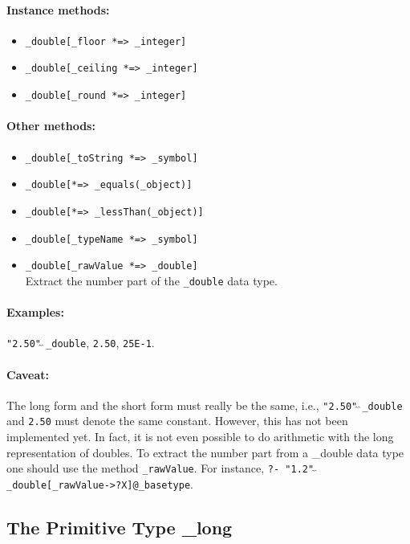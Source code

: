 \documentclass[11pt]{article}
\begin{document}
\paragraph{Instance methods:}
\begin{itemize}
\item {\tt \_double[\_floor *=> \_integer]}
\item {\tt \_double[\_ceiling *=> \_integer]}
\item {\tt \_double[\_round *=> \_integer]}
\end{itemize}

\paragraph{Other methods:}
\begin{itemize}
\item {\tt \_double[\_toString *=> \_symbol]}
\item {\tt \_double[*=> \_equals(\_object)]}
\item {\tt \_double[*=> \_lessThan(\_object)]}
\item {\tt \_double[\_typeName *=> \_symbol]}
\item {\tt \_double[\_rawValue *=> \_double]}
  \\
  Extract the number part of the {\tt \_double} data type. 
\end{itemize}

\paragraph{Examples:}  {\tt "2.50"$\hat{~}\hat{~}$\_double}, {\tt 2.50},
{\tt 25E-1}.

\paragraph{Caveat:}  The long form and the short form must really be the
same, i.e., {\tt "2.50"$\hat{~}\hat{~}$\_double} and {\tt 2.50}
must denote the same constant.  However, this has not been implemented yet.
In fact, it is not even possible to do arithmetic with the long
representation of doubles. To extract the number part from a \_double data
type one should use the method {\tt \_rawValue}.  For instance,
{\tt ?- "1.2"$\hat{~}\hat{~}$\_double[\_rawValue->?X]@\_basetype}.

\subsection{ The Primitive Type \_long}
\end{document}
